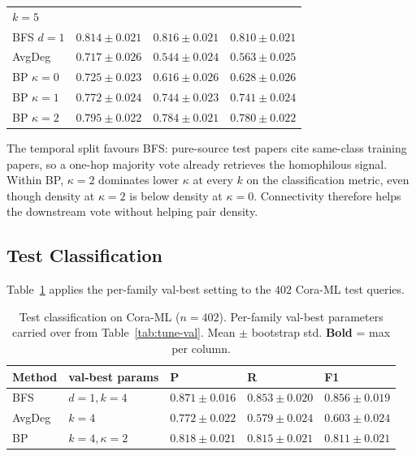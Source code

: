 \documentclass[11pt]{article}
\begin{document}
\begin{table}[t]
\begin{tabular}{llll}
\midrule
\multicolumn{4}{l}{\textit{$k = 5$}} \\
BFS $d = 1$                & \underline{$0.814 \pm 0.021$} & \underline{$0.816 \pm 0.021$} & \underline{$0.810 \pm 0.021$} \\
AvgDeg                     & $0.717 \pm 0.026$ & $0.544 \pm 0.024$ & $0.563 \pm 0.025$ \\
BP $\kappa = 0$            & $0.725 \pm 0.023$ & $0.616 \pm 0.026$ & $0.628 \pm 0.026$ \\
BP $\kappa = 1$            & $0.772 \pm 0.024$ & $0.744 \pm 0.023$ & $0.741 \pm 0.024$ \\
BP $\kappa = 2$            & $0.795 \pm 0.022$ & $0.784 \pm 0.021$ & $0.780 \pm 0.022$ \\
\bottomrule
\end{tabular}
\end{table}

The temporal split favours BFS: pure-source test papers cite same-class
training papers, so a one-hop majority vote already retrieves the
homophilous signal. Within BP, $\kappa = 2$ dominates lower $\kappa$ at
every $k$ on the classification metric, even though density at
$\kappa = 2$ is below density at $\kappa = 0$. Connectivity therefore
helps the downstream vote without helping pair density.

\subsection{Test Classification}
\label{sec:test}

Table~\ref{tab:test-classification} applies the per-family val-best
setting to the $402$ Cora-ML test queries.

\begin{table}[t]
\centering
\footnotesize
\caption{Test classification on Cora-ML ($n = 402$). Per-family val-best
parameters carried over from Table~\ref{tab:tune-val}. Mean $\pm$
bootstrap std. \textbf{Bold} = max per column.}
\label{tab:test-classification}
\begin{tabular}{lllll}
\toprule
Method & val-best params      & P     & R     & F1 \\
\midrule
BFS    & $d = 1, k = 4$       & \textbf{$0.871 \pm 0.016$} & \textbf{$0.853 \pm 0.020$} & \textbf{$0.856 \pm 0.019$} \\
AvgDeg & $k = 4$              & $0.772 \pm 0.022$ & $0.579 \pm 0.024$ & $0.603 \pm 0.024$ \\
BP     & $k = 4, \kappa = 2$  & $0.818 \pm 0.021$ & $0.815 \pm 0.021$ & $0.811 \pm 0.021$ \\
\bottomrule
\end{tabular}
\end{table}
\end{document}
